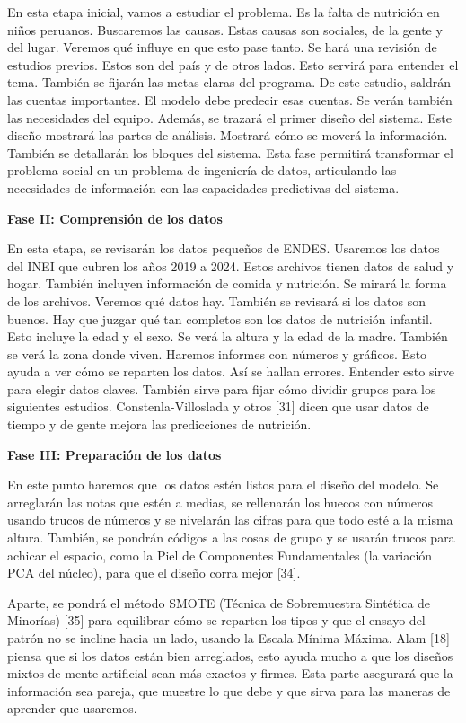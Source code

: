 \documentclass[
]{report}
\begin{document}
En esta etapa inicial, vamos a estudiar el problema. Es la falta de
nutrición en niños peruanos. Buscaremos las causas. Estas causas son
sociales, de la gente y del lugar. Veremos qué influye en que esto pase
tanto. Se hará una revisión de estudios previos. Estos son del país y de
otros lados. Esto servirá para entender el tema. También se fijarán las
metas claras del programa. De este estudio, saldrán las cuentas
importantes. El modelo debe predecir esas cuentas. Se verán también las
necesidades del equipo. Además, se trazará el primer diseño del sistema.
Este diseño mostrará las partes de análisis. Mostrará cómo se moverá la
información. También se detallarán los bloques del sistema. Esta fase
permitirá transformar el problema social en un problema de ingeniería de
datos, articulando las necesidades de información con las capacidades
predictivas del sistema.

\textbf{Fase II: Comprensión de los datos}

En esta etapa, se revisarán los datos pequeños de ENDES. Usaremos los
datos del INEI que cubren los años 2019 a 2024. Estos archivos tienen
datos de salud y hogar. También incluyen información de comida y
nutrición. Se mirará la forma de los archivos. Veremos qué datos hay.
También se revisará si los datos son buenos. Hay que juzgar qué tan
completos son los datos de nutrición infantil. Esto incluye la edad y el
sexo. Se verá la altura y la edad de la madre. También se verá la zona
donde viven. Haremos informes con números y gráficos. Esto ayuda a ver
cómo se reparten los datos. Así se hallan errores. Entender esto sirve
para elegir datos claves. También sirve para fijar cómo dividir grupos
para los siguientes estudios. Constenla-Villoslada y otros {[}31{]}
dicen que usar datos de tiempo y de gente mejora las predicciones de
nutrición.

\textbf{Fase III: Preparación de los datos}

En este punto haremos que los datos estén listos para el diseño del
modelo. Se arreglarán las notas que estén a medias, se rellenarán los
huecos con números usando trucos de números y se nivelarán las cifras
para que todo esté a la misma altura. También, se pondrán códigos a las
cosas de grupo y se usarán trucos para achicar el espacio, como la Piel
de Componentes Fundamentales (la variación PCA del núcleo), para que el
diseño corra mejor {[}34{]}.

Aparte, se pondrá el método SMOTE (Técnica de Sobremuestra Sintética de
Minorías) {[}35{]} para equilibrar cómo se reparten los tipos y que el
ensayo del patrón no se incline hacia un lado, usando la Escala Mínima
Máxima. Alam {[}18{]} piensa que si los datos están bien arreglados,
esto ayuda mucho a que los diseños mixtos de mente artificial sean más
exactos y firmes. Esta parte asegurará que la información sea pareja,
que muestre lo que debe y que sirva para las maneras de aprender que
usaremos.
\end{document}
